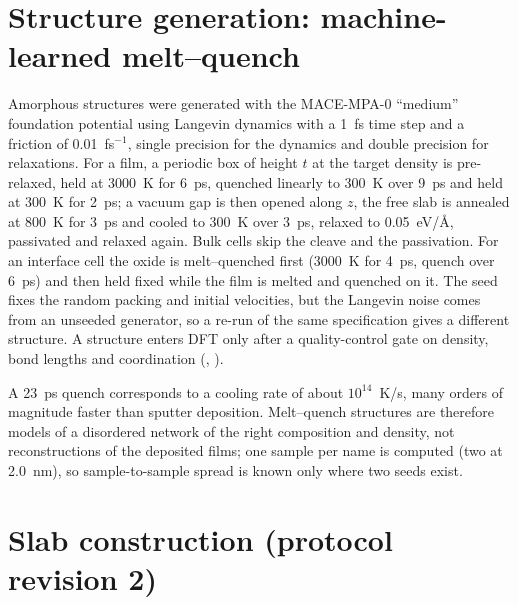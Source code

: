 \section{Structure generation: machine-learned melt--quench}
\label{sec:mono-am-mace}

Amorphous structures were generated with the MACE-MPA-0 ``medium'' foundation potential \citep{Batatia2022,Batatia2023}
using Langevin dynamics with a 1~fs time step and a friction of 0.01~fs$^{-1}$, single precision for the dynamics and
double precision for relaxations. For a film, a periodic box of height $t$ at the target density is pre-relaxed, held at
3000~K for 6~ps, quenched linearly to 300~K over 9~ps and held at 300~K for 2~ps; a vacuum gap is then opened along
$z$, the free slab is annealed at 800~K for 3~ps and cooled to 300~K over 3~ps, relaxed to 0.05~eV/\AA, passivated and
relaxed again. Bulk cells skip the cleave and the passivation. For an interface cell the oxide is melt--quenched first
(3000~K for 4~ps, quench over 6~ps) and then held fixed while the film is melted and quenched on it. The seed fixes
the random packing and initial velocities, but the Langevin noise comes from an unseeded generator, so a re-run of the
same specification gives a different structure. A structure enters DFT only after a quality-control gate on density,
bond lengths and coordination (, ).

\begin{caveat}
A 23~ps quench corresponds to a cooling rate of about $10^{14}$~K/s, many orders of magnitude faster than sputter
deposition. Melt--quench structures are therefore models of a disordered network of the right composition and density,
not reconstructions of the deposited films; one sample per name is computed (two at 2.0~nm), so sample-to-sample
spread is known only where two seeds exist.
\end{caveat}

\section{Slab construction (protocol revision 2)}
\label{sec:mono-am-slabs}

